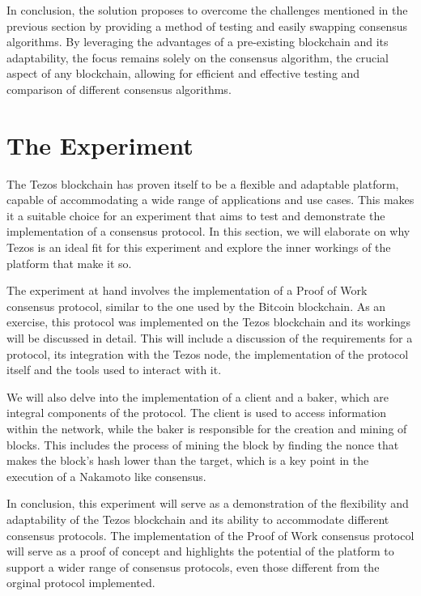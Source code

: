 In conclusion, the solution proposes to overcome the challenges mentioned in the previous section by providing a method of testing and easily swapping consensus algorithms. By leveraging the advantages of a pre-existing blockchain and its adaptability, the focus remains solely on the consensus algorithm, the crucial aspect of any blockchain, allowing for efficient and effective testing and comparison of different consensus algorithms.


\section{The Experiment}

The Tezos blockchain has proven itself to be a flexible and adaptable platform, capable of accommodating a wide range of applications and use cases. This makes it a suitable choice for an experiment that aims to test and demonstrate the implementation of a consensus protocol. In this section, we will elaborate on why Tezos is an ideal fit for this experiment and explore the inner workings of the platform that make it so.

The experiment at hand involves the implementation of a Proof of Work consensus protocol, similar to the one used by the Bitcoin blockchain.
As an exercise, this protocol was implemented on the Tezos blockchain and its workings will be discussed in detail. This will include a discussion of the requirements for a protocol, its integration with the Tezos node, the implementation of the protocol itself and the tools used to interact with it.

We will also delve into the implementation of a client and a baker, which are integral components of the protocol. The client is used to access information within the network, while the baker is responsible for the creation and mining of blocks. This includes the process of mining the block by finding the nonce that makes the block's hash lower than the target, which is a key point in the execution of a Nakamoto like consensus.

In conclusion, this experiment will serve as a demonstration of the flexibility and adaptability of the Tezos blockchain and its ability to accommodate different consensus protocols. The implementation of the Proof of Work consensus protocol will serve as a proof of concept and highlights the potential of the platform to support a wider range of consensus protocols, even those different from the orginal protocol implemented.


